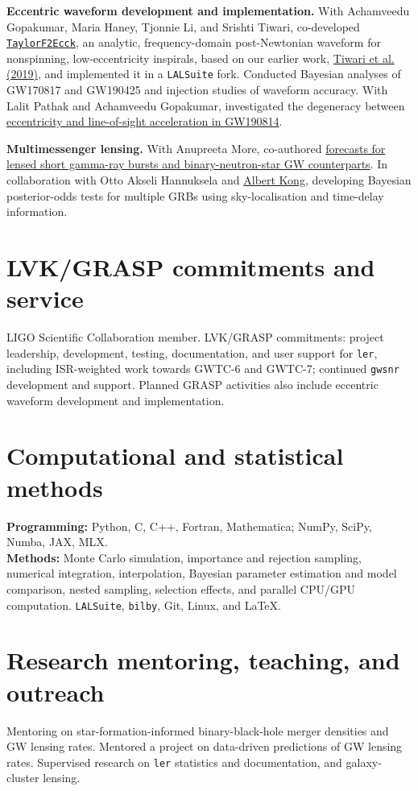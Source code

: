 \documentclass[11pt]{article}
\begin{document}
\textbf{Eccentric waveform development and implementation.} With Achamveedu Gopakumar, Maria Haney, Tjonnie Li, and Srishti Tiwari, co-developed \href{https://arxiv.org/abs/2508.12697}{\texttt{TaylorF2Ecck}}, an analytic, frequency-domain post-Newtonian waveform for nonspinning, low-eccentricity inspirals, based on our earlier work, \href{https://arxiv.org/abs/1905.07956}{Tiwari et al. (2019)}, and implemented it in a \texttt{LALSuite} fork. Conducted Bayesian analyses of GW170817 and GW190425 and injection studies of waveform accuracy. With Lalit Pathak and Achamveedu Gopakumar, investigated the degeneracy between \href{https://arxiv.org/abs/2605.21955}{eccentricity and line-of-sight acceleration in GW190814}.

\textbf{Multimessenger lensing.} With Anupreeta More, co-authored \href{https://arxiv.org/abs/2502.02536}{forecasts for lensed short gamma-ray bursts and binary-neutron-star GW counterparts}. In collaboration with Otto Akseli Hannuksela and \href{https://iphd.site.nthu.edu.tw/p/406-1222-87294,r5205.php?Lang=en}{Albert Kong}, developing Bayesian posterior-odds tests for multiple GRBs using sky-localisation and time-delay information.

\section*{LVK/GRASP commitments and service}
LIGO Scientific Collaboration member. LVK/GRASP commitments: project leadership, development, testing, documentation, and user support for \texttt{ler}, including ISR-weighted work towards GWTC-6 and GWTC-7; continued \texttt{gwsnr} development and support. Planned GRASP activities also include eccentric waveform development and implementation.

\section*{Computational and statistical methods}
\textbf{Programming:} Python, C, C++, Fortran, Mathematica; NumPy, SciPy, Numba, JAX, MLX.\\
\textbf{Methods:} Monte Carlo simulation, importance and rejection sampling, numerical integration, interpolation, Bayesian parameter estimation and model comparison, nested sampling, selection effects, and parallel CPU/GPU computation. \texttt{LALSuite}, \texttt{bilby}, Git, Linux, and \LaTeX.

\newpage
\section*{Research mentoring, teaching, and outreach}
Mentoring on star-formation-informed binary-black-hole merger densities and GW lensing rates.
Mentored a project on data-driven predictions of GW lensing rates.
Supervised research on \texttt{ler} statistics and documentation, and galaxy-cluster lensing.
\end{document}
